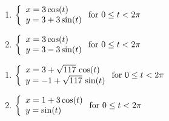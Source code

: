 \documentclass{ximera}
\begin{document}
\begin{multicols}{2}

\begin{enumerate}

\setcounter{enumi}{\value{HW}}

\item   ${\displaystyle \left\{ \begin{array}{l} x = 3\cos(t) \\ y = 3 + 3\sin(t)  \end{array} \right. \vspace{.25in} \mbox{for } 0 \leq t < 2\pi}$

\item   ${\displaystyle \left\{ \begin{array}{l} x = 3\cos(t) \\ y = 3 - 3\sin(t)  \end{array} \right. \vspace{.25in} \mbox{for } 0 \leq t < 2\pi }$

\setcounter{HW}{\value{enumi}}

\end{enumerate}

\end{multicols}



\begin{multicols}{2}

\begin{enumerate}

\setcounter{enumi}{\value{HW}}
\item   ${\displaystyle \left\{ \begin{array}{l} x = 3+\sqrt{117} \, \cos(t) \\ y = -1 + \sqrt{117} \, \sin(t)  \end{array} \right. \vspace{.25in} \mbox{for } 0 \leq t < 2\pi}$
\item   ${\displaystyle \left\{ \begin{array}{l} x = 1+3\cos(t) \\ y = \sin(t)  \end{array} \right. \vspace{.25in} \mbox{for } 0 \leq t < 2\pi}$

\setcounter{HW}{\value{enumi}}

\end{enumerate}

\end{multicols}
\end{document}
